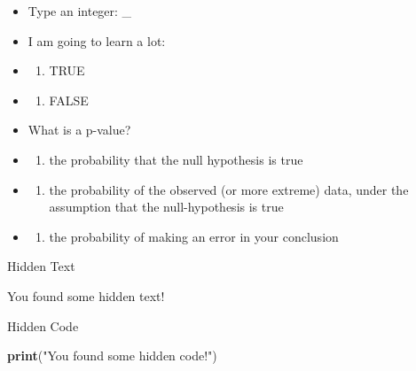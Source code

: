 \documentclass[
  oneside]{book}
\newenvironment{Shaded}{\begin{snugshade}}{\end{snugshade}}
\newcommand{\FunctionTok}[1]{\textcolor[rgb]{0.13,0.29,0.53}{\textbf{#1}}}
\newcommand{\NormalTok}[1]{#1}
\newcommand{\StringTok}[1]{\textcolor[rgb]{0.31,0.60,0.02}{#1}}
\providecommand{\tightlist}{%
  \setlength{\itemsep}{0pt}\setlength{\parskip}{0pt}}
\begin{document}
\begin{itemize}
\item
  Type an integer: \_
\item
  I am going to learn a lot:
\item
  \begin{enumerate}
  \def\labelenumi{(\Alph{enumi})}
  \tightlist
  \item
    TRUE\\
  \end{enumerate}
\item
  \begin{enumerate}
  \def\labelenumi{(\Alph{enumi})}
  \setcounter{enumi}{1}
  \tightlist
  \item
    FALSE
  \end{enumerate}
\item
  What is a p-value?
\item
  \begin{enumerate}
  \def\labelenumi{(\Alph{enumi})}
  \tightlist
  \item
    the probability that the null hypothesis is true\\
  \end{enumerate}
\item
  \begin{enumerate}
  \def\labelenumi{(\Alph{enumi})}
  \setcounter{enumi}{1}
  \tightlist
  \item
    the probability of the observed (or more extreme) data, under the assumption that the null-hypothesis is true\\
  \end{enumerate}
\item
  \begin{enumerate}
  \def\labelenumi{(\Alph{enumi})}
  \setcounter{enumi}{2}
  \tightlist
  \item
    the probability of making an error in your conclusion
  \end{enumerate}
\end{itemize}

Hidden Text

You found some hidden text!

Hidden Code

\begin{Shaded}
\begin{Highlighting}[]
\FunctionTok{print}\NormalTok{(}\StringTok{"You found some hidden code!"}\NormalTok{)}
\end{Highlighting}
\end{Shaded}
\end{document}
